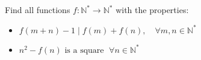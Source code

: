 Find all functions $f:\mathbb{N}^{\ast}\rightarrow\mathbb{N}^{\ast}$ with
the properties:
\begin{itemize}
	\item $ f(m+n)  -1 \mid f(m)+f(n),\quad  \forall m,n\in\mathbb{N}^{\ast} $
	\item $ n^{2}-f(n)\text{ is a square } \;\forall n\in\mathbb{N}^{\ast} $
\end{itemize}

